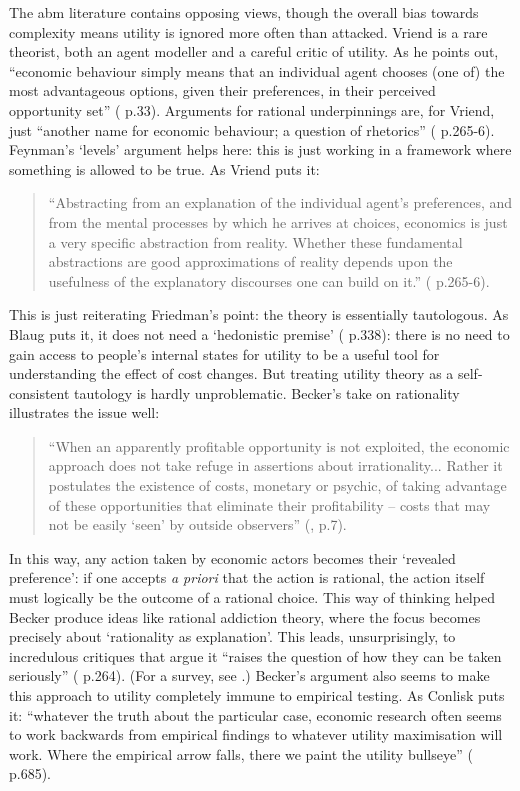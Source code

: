 The \gls{abm} literature contains opposing views, though the overall bias towards complexity means utility is ignored more often than attacked. Vriend is a rare theorist, both an agent modeller and a careful critic of utility. As he points out, ``economic behaviour simply means that an individual agent chooses (one of) the most advantageous options, given their preferences, in their perceived opportunity set'' (\citealt{hillebrand_artificial_1994} p.33). Arguments for rational underpinnings are, for Vriend, just ``another name for economic behaviour; a question of rhetorics'' (\citealt{vriend_rational_1996} p.265-6). Feynman's `levels' argument helps here: this is just working in a framework where something is allowed to be true. As Vriend puts it:

\begin{quote} 
``Abstracting from an explanation of the individual agent's preferences, and from the mental processes by which he arrives at choices, economics is just a very specific abstraction from reality. Whether these fundamental abstractions are good approximations of reality depends upon the usefulness of the explanatory discourses one can build on it.'' (\citealt{vriend_rational_1996} p.265-6).
\end{quote}

This is just reiterating Friedman's point: the theory is essentially tautologous. As Blaug puts it, it does not need a `hedonistic premise' (\citealt{blaug_economic_1997} p.338): there is no need to gain access to people's internal states for utility to be a useful tool for understanding the effect of cost changes. But treating utility theory as a self-consistent tautology is hardly unproblematic. Becker's take on rationality illustrates the issue well:

\begin{quote}
``When an apparently profitable opportunity is not exploited, the economic approach does not take refuge in assertions about irrationality... Rather it postulates the existence of costs, monetary or psychic, of taking advantage of these opportunities that eliminate their profitability – costs that may not be easily `seen' by outside observers'' (\citealt{becker_economic_1976}, p.7).
\end{quote}

In this way, any action taken by economic actors becomes their `revealed preference': if one accepts \emph{a priori} that the action is rational, the action itself must logically be the outcome of a rational choice. This way of thinking helped Becker produce ideas like rational addiction theory, where the focus becomes precisely about `rationality as explanation'. This leads, unsurprisingly, to incredulous critiques that argue it ``raises the question of how they can be taken seriously'' (\citealt{rogeberg_taking_2004} p.264). (For a survey, see \citealt{melberg_rational_2010}.) Becker's argument also seems to make this approach to utility completely immune to empirical testing. As Conlisk puts it: ``whatever the truth about the particular case, economic research often seems to work backwards from empirical findings to whatever utility maximisation will work. Where the empirical arrow falls, there we paint the utility bullseye'' (\citealt{conlisk_why_1996} p.685). 

